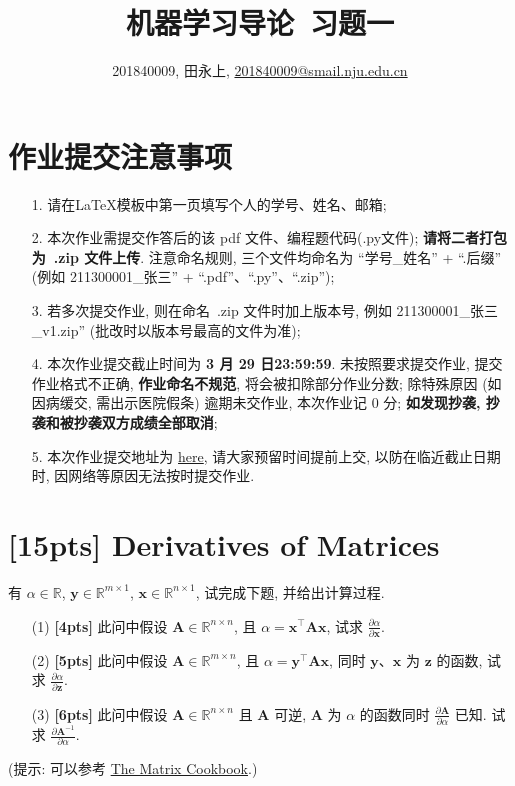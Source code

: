 \documentclass[a4paper,UTF8]{article}
\numberwithin{equation}{section}
\theoremstyle{definition}
\def \A {\mathbf{A}}
\def \y {\mathbf{y}}
\def \x {\mathbf{x}}
\def \z {\mathbf{z}}
\begin{document}
\title{机器学习导论\ 习题一}
\author{201840009, 田永上, \href{mailto:邮箱}{201840009@smail.nju.edu.cn}}
\maketitle
\section*{作业提交注意事项}
\begin{tcolorbox}
	\begin{enumerate}
		\item[1.] 请在LaTeX模板中第一页填写个人的学号、姓名、邮箱;
		\item[2.] 本次作业需提交作答后的该 pdf 文件、编程题代码(.py文件); {\color{red}\textbf{请将二者打包为~.zip 文件上传}}. 注意命名规则, 三个文件均命名为 “学号\_姓名” + “.后缀” (例如 211300001\_张三” + “.pdf”、“.py”、“.zip”);
		\item[3.] 若多次提交作业, 则在命名~.zip 文件时加上版本号, 例如 211300001\_张三\_v1.zip” (批改时以版本号最高的文件为准);
		\item[4.] 本次作业提交截止时间为 {\color{red}\textbf{ 3 月 29 日23:59:59}}. 未按照要求提交作业, 提交作业格式不正确, {\color{red}\textbf{作业命名不规范}}, 将会被扣除部分作业分数; 除特殊原因 (如因病缓交, 需出示医院假条) 逾期未交作业, 本次作业记 0 分; {\color{red}\textbf{如发现抄袭, 抄袭和被抄袭双方成绩全部取消}};
		\item[5.] 本次作业提交地址为 \href{https://box.nju.edu.cn/u/d/008080744a60484ea526/}{here}, 请大家预留时间提前上交, 以防在临近截止日期时, 因网络等原因无法按时提交作业.
	\end{enumerate}
\end{tcolorbox}
\newpage


\section{[15pts] Derivatives of Matrices}
 有 $\alpha \in \mathbb{R}$, $\y\in \mathbb{R}^{m×1}$, $\x\in \mathbb{R}^{n×1}$, 试完成下题, 并给出计算过程.
\begin{enumerate}
	\item[(1)] \textbf{[4pts]} 此问中假设 $\A\in \mathbb{R}^{n×n}$, 且 $\alpha=\x^\top\A\x$, 试求 $\frac{\partial \alpha}{\partial \x}$.
	\item[(2)] \textbf{[5pts]} 此问中假设 $\A\in \mathbb{R}^{m×n}$, 且 $\alpha=\y^\top\A\x$, 同时 $\y$、$\x$ 为 $\z$ 的函数, 试求 $\frac{\partial \alpha}{\partial \z}$.
	\item[(3)] \textbf{[6pts]} 此问中假设 $\A\in \mathbb{R}^{n×n}$ 且 $\A$ 可逆, $\A$ 为 $\alpha$ 的函数同时 $\frac{\partial \A}{\partial \alpha}$ 已知. 试求 $\frac{\partial \A^{-1}}{\partial \alpha}$.
\end{enumerate}
(提示: 可以参考 \href{https://www.math.uwaterloo.ca/~hwolkowi/matrixcookbook.pdf}{The Matrix Cookbook}.)
\end{document}
